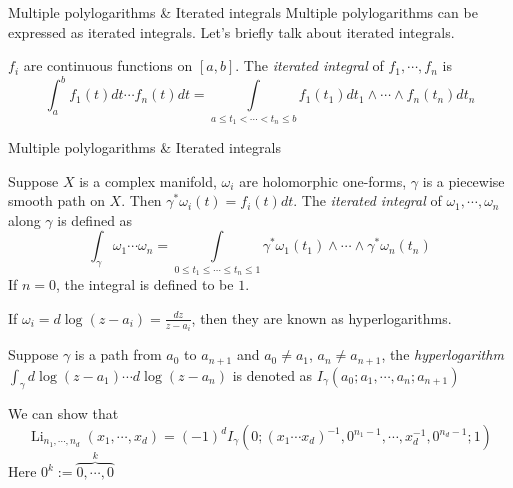 \documentclass[8pt]{beamer}
\DeclareMathOperator{\Li}{Li}
\theoremstyle{definition}
\theoremstyle{remark}
\begin{document}
\begin{frame}[t]{Multiple polylogarithms \& Iterated integrals}
Multiple polylogarithms can be expressed as iterated integrals. Let's briefly talk about iterated integrals.
\begin{definition}
$f_i$ are continuous functions on $[a,b]$. The \textit{iterated integral} of $f_1,\cdots,f_n$ is
\begin{equation}
\int_a^bf_1(t)dt\cdots f_n(t)dt=\int\limits_{a\leq t_1<\cdots<t_n\leq b}f_1(t_1)dt_1\wedge\cdots\wedge f_n(t_n)dt_n
\end{equation}
\end{definition}

\end{frame}

\begin{frame}[t]{Multiple polylogarithms \& Iterated integrals}
\begin{definition}
Suppose $X$ is a complex manifold, $\omega_i$ are holomorphic one-forms, $\gamma$ is a piecewise smooth path on $X$. Then $\gamma^*\omega_i(t)=f_i(t)dt$. The \textit{iterated integral} of $\omega_1,\cdots,\omega_n$ along $\gamma$ is defined as
\begin{equation}
\int_\gamma\omega_1\cdots\omega_n=\int\limits_{0\leq t_1\leq\cdots\leq t_n\leq 1}\gamma^*\omega_1(t_1)\wedge\cdots\wedge\gamma^*\omega_n(t_n)
\end{equation}
If $n=0$, the integral is defined to be $1$.
\end{definition}

If $\omega_i=d\log(z-a_i)=\frac{dz}{z-a_i}$, then they are known as hyperlogarithms.
\begin{definition}
Suppose $\gamma$ is a path from $a_0$ to $a_{n+1}$ and $a_0\neq a_1$, $a_n\neq a_{n+1}$, the \textit{hyperlogarithm} $\int_\gamma d\log(z-a_1)\cdots d\log(z-a_n)$ is denoted as $I_\gamma(a_0;a_1,\cdots,a_n;a_{n+1})$
\end{definition}

We can show that
\begin{equation}
\Li_{n_1,\cdots,n_d}(x_1,\cdots,x_d)=(-1)^dI_\gamma(0;(x_1\cdots x_d)^{-1},0^{n_1-1},\cdots,x_d^{-1},0^{n_d-1};1)
\end{equation}
Here $0^k:=\overbrace{0,\cdots,0}^k$
\end{frame}
\end{document}
